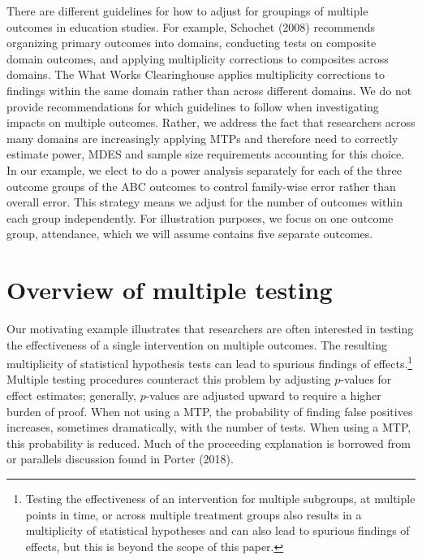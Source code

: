 \documentclass{article}
\begin{document}
There are different guidelines for how to adjust for groupings of
multiple outcomes in education studies. For example, Schochet (2008)
recommends organizing primary outcomes into domains, conducting tests on
composite domain outcomes, and applying multiplicity corrections to
composites across domains. The What Works Clearinghouse applies
multiplicity corrections to findings within the same domain rather than
across different domains. We do not provide recommendations for which
guidelines to follow when investigating impacts on multiple outcomes.
Rather, we address the fact that researchers across many domains are
increasingly applying MTPs and therefore need to correctly estimate
power, MDES and sample size requirements accounting for this choice. In
our example, we elect to do a power analysis separately for each of the
three outcome groups of the ABC outcomes to control family-wise error
rather than overall error. This strategy means we adjust for the number
of outcomes within each group independently. For illustration purposes,
we focus on one outcome group, attendance, which we will assume contains
five separate outcomes.

\section{Overview of multiple testing}
\label{sec:mtp_overview}

Our motivating example illustrates that researchers are often interested
in testing the effectiveness of a single intervention on multiple
outcomes. The resulting multiplicity of statistical hypothesis tests can
lead to spurious findings of effects.\footnote{Testing the effectiveness
  of an intervention for multiple subgroups, at multiple points in time,
  or across multiple treatment groups also results in a multiplicity of
  statistical hypotheses and can also lead to spurious findings of
  effects, but this is beyond the scope of this paper.} Multiple testing
procedures counteract this problem by adjusting \(p\)-values for effect
estimates; generally, \(p\)-values are adjusted upward to require a
higher burden of proof. When not using a MTP, the probability of finding
false positives increases, sometimes dramatically, with the number of
tests. When using a MTP, this probability is reduced. Much of the
proceeding explanation is borrowed from or parallels discussion found in
Porter (2018).
\end{document}
